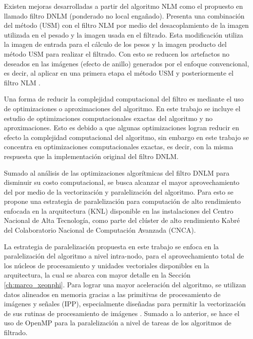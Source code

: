 Existen mejoras desarrolladas a partir del algoritmo NLM como el propuesto en \cite{calderon2015dewaff} llamado filtro DNLM  (ponderado no local enga\~nado). Presenta una combinaci\'on del m\'etodo  (USM) con el filtro NLM por medio del desacoplamiento de la imagen utilizada en el pesado y la imagen usada en el filtrado. Esta modificaci\'on utiliza la imagen de entrada para el c\'alculo de los pesos y la imagen producto del m\'etodo USM para realizar el filtrado. Con esto se reducen los artefactos no deseados en las im\'agenes (efecto de anillo) generados por el enfoque convencional, es decir, al aplicar en una primera etapa el m\'etodo USM y posteriormente el filtro NLM \cite{calderon2015dewaff}.  


Una forma de reducir la complejidad computacional del filtro es mediante el uso de optimizaciones o aproximaciones del algoritmo. En este trabajo se incluye el estudio de optimizaciones computacionales exactas del algoritmo y no aproximaciones. Esto es debido a que algunas optimizaciones logran reducir en efecto la complejidad computacional del algoritmo, sin embargo en este trabajo se concentra en optimizaciones computacionales exactas, es decir, con la misma respuesta que la implementaci\'on original del filtro DNLM. 

Sumado al an\'alisis de las optimizaciones algor\'itmicas del filtro DNLM para disminuir su costo computacional, se busca alcanzar el mayor aprovechamiento del  por medio de la vectorizaci\'on y paralelizaci\'on del algoritmo. Para esto se propone una estrategia de paralelizaci\'on para computaci\'on de alto rendimiento enfocada en la arquitectura  (KNL) disponible en las instalaciones del Centro Nacional de Alta Tecnolog\'ia, como parte del cl\'uster de alto rendimiento Kabr\'e del Colaboratorio Nacional de Computaci\'on Avanzada (CNCA).

La estrategia de paralelizaci\'on propuesta en este trabajo se enfoca en la paralelizaci\'on del algoritmo a nivel intra-nodo, para el aprovechamiento total de los n\'ucleos de procesamiento y unidades vectoriales disponibles en la arquitectura, la cual se abarca con mayor detalle en la Secci\'on \ref{ch:marco_xeonphi}. 
Para lograr una mayor aceleraci\'on del algoritmo, se utilizan datos alineados en memoria gracias a las primitivas de procesamiento de im\'agenes y se\~nales  (IPP), especialmente dise\~nadas para permitir la vectorizaci\'on de sus rutinas de procesamiento de im\'agenes \cite{IntelCorporation2017}. Sumado a lo anterior, se hace el uso de OpenMP para la paralelizaci\'on a nivel de tareas de los algoritmos de filtrado. 

